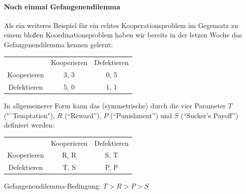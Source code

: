 \paragraph{Noch einmal Gefangenendilemma} Als ein weiteres Beispiel für ein
echtes Kooperationsproblem im Gegensatz zu einem bloßen Koordinationsproblem haben
wir bereits in der letzen Woche das Gefangenendilemma kennen gelernt:
\begin{center}
\begin{tabular}{c|c|c|}
\multicolumn{1}{c}{} & \multicolumn{1}{c}{Kooperieren} &
                                \multicolumn{1}{c}{Defektieren} \\ \cline{2-3} 
Kooperieren          & 3, 3                   & 0, 5  \\ \cline{2-3}
Defektieren          & 5, 0                   & 1, 1 \\ \cline{2-3}
\end{tabular}
\end{center}
In allgemeinerer Form kann das (symmetrische) durch die vier Parameter
$T$ ("`Temptation"), $R$ ("`Reward"'), $P$ ("`Punishment"') und $S$ ("`Sucker's
Payoff"') definiert werden:
\begin{center}
\setlength{\parskip}{0.25cm}
\begin{tabular}{c|c|c|}
\multicolumn{1}{c}{} & \multicolumn{1}{c}{Kooperieren} &
                                \multicolumn{1}{c}{Defektieren} \\ \cline{2-3} 
Kooperieren          & R, R                   & S, T  \\ \cline{2-3}
Defektieren          & T, S                   & P, P \\ \cline{2-3}
\end{tabular}
\label{GefangenendilemmaTabelle}

Gefangenendilemma-Bedingung: $T > R > P > S$
\end{center}

